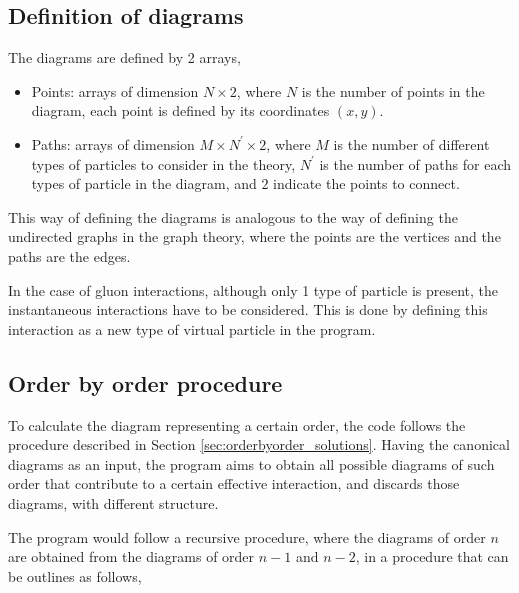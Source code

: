 \documentclass[11pt,a4paper,twoside,pdf]{article}
\numberwithin{equation}{section}
\begin{document}
\subsection{Definition of diagrams}

The diagrams are defined by 2 arrays, 
\begin{itemize}
    \item Points: arrays of dimension $N \times 2$, where $N$ is the number of 
    points in the diagram, each point is defined by its coordinates $(x,y)$.
    \item Paths: arrays of dimension $M \times N^\prime \times 2$, where $M$ is the
    number of different types of particles to consider in the theory, $N^\prime$ 
    is the number of paths for each types of particle in the diagram, and $2$ indicate
    the points to connect.
\end{itemize}

This way of defining the diagrams is analogous to the way of defining the undirected 
graphs in the graph theory, where the points are the vertices and the paths are the 
edges. 

In the case of gluon interactions, although only 1 type of particle is present, the
instantaneous interactions have to be considered. This is done by defining this 
interaction as a new type of virtual particle in the program.

\subsection{Order by order procedure}

To calculate the diagram representing a certain order, the code follows the 
procedure described in Section \ref{sec:orderbyorder_solutions}. Having the
canonical diagrams as an input, the program aims to obtain all possible diagrams of such order
that contribute to a certain effective interaction, and discards those diagrams, with
different structure.

The program would follow a recursive procedure, where the diagrams of order $n$ are
obtained from the diagrams of order $n-1$ and $n-2$, in a procedure that can be outlines
as follows,
\end{document}
